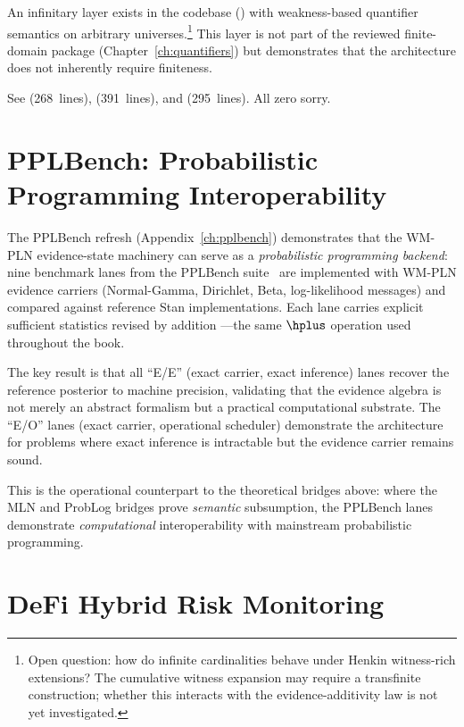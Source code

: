 \documentclass[11pt,openany]{report}
\begin{document}
An infinitary layer exists in the codebase
() with weakness-based quantifier
semantics on arbitrary universes.\footnote{Open question: how do infinite
cardinalities behave under Henkin witness-rich extensions?  The
cumulative witness expansion may require a transfinite construction;
whether this interacts with the evidence-additivity law is not yet
investigated.}  This layer is not part of the reviewed finite-domain
package (Chapter~\ref{ch:quantifiers}) but demonstrates that the
architecture does not inherently require finiteness.

\medskip
\noindent
See  (268~lines),
 (391~lines),
and 
(295~lines).  All zero sorry.


\section{PPLBench: Probabilistic Programming Interoperability}
\label{sec:pplbench-bridge}

The PPLBench refresh (Appendix~\ref{ch:pplbench}) demonstrates that the
WM-PLN evidence-state machinery can serve as a \emph{probabilistic
programming backend}: nine benchmark lanes from the PPLBench
suite~\cite{Lao2021PPLBench} are implemented with WM-PLN
evidence carriers (Normal-Gamma, Dirichlet, Beta, log-likelihood
messages) and compared against reference Stan implementations.
Each lane carries explicit sufficient statistics revised by addition
---the same $\hplus$ operation used throughout the book.

The key result is that all ``E/E'' (exact carrier, exact inference)
lanes recover the reference posterior to machine precision, validating
that the evidence algebra is not merely an abstract formalism but a
practical computational substrate.  The ``E/O'' lanes (exact carrier,
operational scheduler) demonstrate the architecture for problems where
exact inference is intractable but the evidence carrier remains sound.

This is the operational counterpart to the theoretical bridges above:
where the MLN and ProbLog bridges prove \emph{semantic} subsumption,
the PPLBench lanes demonstrate \emph{computational} interoperability
with mainstream probabilistic programming.


\section{DeFi Hybrid Risk Monitoring}
\end{document}
